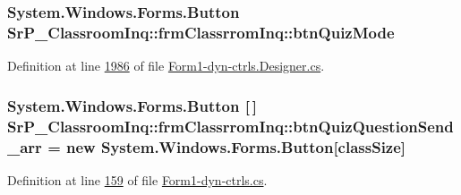 \hypertarget{class_sr_p___classroom_inq_1_1frm_classrrom_inq_aed01a9041d00e0bef6cd7661bc9507d6}{
\subsubsection[{btn\-Quiz\-Mode}]{\setlength{\rightskip}{0pt plus 5cm}\-System.\-Windows.\-Forms.\-Button {\bf \-Sr\-P\-\_\-\-Classroom\-Inq\-::frm\-Classrrom\-Inq\-::btn\-Quiz\-Mode}}}
\label{class_sr_p___classroom_inq_1_1frm_classrrom_inq_aed01a9041d00e0bef6cd7661bc9507d6}


\-Definition at line \hyperlink{_form1-dyn-ctrls_8_designer_8cs_source_l01986}{1986} of file \hyperlink{_form1-dyn-ctrls_8_designer_8cs_source}{\-Form1-\/dyn-\/ctrls.\-Designer.\-cs}.

\hypertarget{class_sr_p___classroom_inq_1_1frm_classrrom_inq_a007012d0330b5c8ad6b29271ddefe7f9}{
\subsubsection[{btn\-Quiz\-Question\-Send\-\_\-arr}]{\setlength{\rightskip}{0pt plus 5cm}\-System.\-Windows.\-Forms.\-Button \mbox{[}$\,$\mbox{]} {\bf \-Sr\-P\-\_\-\-Classroom\-Inq\-::frm\-Classrrom\-Inq\-::btn\-Quiz\-Question\-Send\-\_\-arr} = new \-System.\-Windows.\-Forms.\-Button\mbox{[}{\bf class\-Size}\mbox{]}}}
\label{class_sr_p___classroom_inq_1_1frm_classrrom_inq_a007012d0330b5c8ad6b29271ddefe7f9}


\-Definition at line \hyperlink{_form1-dyn-ctrls_8cs_source_l00159}{159} of file \hyperlink{_form1-dyn-ctrls_8cs_source}{\-Form1-\/dyn-\/ctrls.\-cs}.

